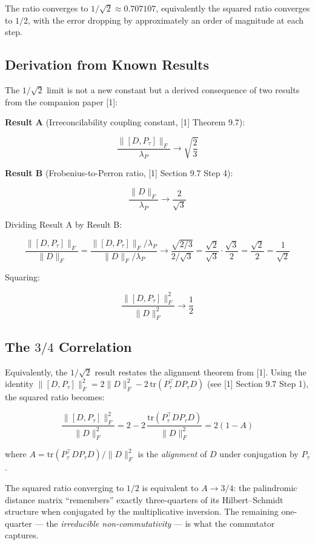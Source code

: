 \documentclass[11pt,letterpaper]{article}
\theoremstyle{definition}
\theoremstyle{remark}
\begin{document}
The ratio converges to $1/\sqrt{2} \approx 0.707107$, equivalently the squared ratio converges to $1/2$, with the error dropping by approximately an order of magnitude at each step.

\subsection{Derivation from Known Results}\label{derivation-from-known-results}

The $1/\sqrt{2}$ limit is not a new constant but a derived consequence of two results from the companion paper [1]:

\textbf{Result A} (Irreconcilability coupling constant, [1] Theorem 9.7):

\[\frac{\|[D, P_\tau]\|_F}{\lambda_P} \longrightarrow \sqrt{\frac{2}{3}}\]

\textbf{Result B} (Frobenius-to-Perron ratio, [1] Section 9.7 Step 4):

\[\frac{\|D\|_F}{\lambda_P} \longrightarrow \frac{2}{\sqrt{3}}\]

Dividing Result A by Result B:

\[\frac{\|[D, P_\tau]\|_F}{\|D\|_F} = \frac{\|[D, P_\tau]\|_F / \lambda_P}{\|D\|_F / \lambda_P} \longrightarrow \frac{\sqrt{2/3}}{2/\sqrt{3}} = \frac{\sqrt{2}}{\sqrt{3}} \cdot \frac{\sqrt{3}}{2} = \frac{\sqrt{2}}{2} = \frac{1}{\sqrt{2}}\]

Squaring:

\[\frac{\|[D, P_\tau]\|_F^2}{\|D\|_F^2} \longrightarrow \frac{1}{2}\]

\subsection{The $3/4$ Correlation}\label{the-34-correlation}

Equivalently, the $1/\sqrt{2}$ result restates the alignment theorem from [1]. Using the identity $\|[D,P_\tau]\|_F^2 = 2\|D\|_F^2 - 2\,\text{tr}(P_\tau^\top D P_\tau D)$ (see [1] Section 9.7 Step 1), the squared ratio becomes:

\[\frac{\|[D,P_\tau]\|_F^2}{\|D\|_F^2} = 2 - 2\,\frac{\text{tr}(P_\tau^\top D P_\tau D)}{\|D\|_F^2} = 2(1 - A)\]

where $A = \text{tr}(P_\tau^\top D P_\tau D) / \|D\|_F^2$ is the \emph{alignment} of $D$ under conjugation by $P_\tau$.

The squared ratio converging to $1/2$ is equivalent to $A \to 3/4$: the palindromic distance matrix ``remembers'' exactly three-quarters of its Hilbert--Schmidt structure when conjugated by the multiplicative inversion. The remaining one-quarter --- the \emph{irreducible non-commutativity} --- is what the commutator captures.
\end{document}
